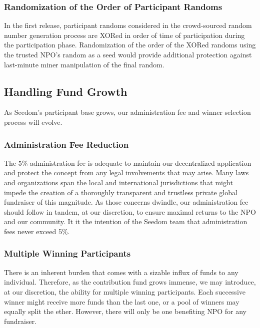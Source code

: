 \documentclass[11pt]{article}
\begin{document}
\subsubsection{Randomization of the Order of Participant Randoms}
\label{sec:randomizationOfTheOrderOfParticipantRandoms}

In the first release, participant randoms considered in the crowd-sourced random number generation process are XORed in order of time of participation during the participation phase. Randomization of the order of the XORed randoms using the trusted NPO's random as a seed would provide additional protection against last-minute miner manipulation of the final random.

\subsection{Handling Fund Growth}

As Seedom's participant base grows, our administration fee and winner selection process will evolve.

\subsubsection{Administration Fee Reduction}

The 5\% administration fee is adequate to maintain our decentralized application and protect the concept from any legal involvements that may arise. Many laws and organizations span the local and international jurisdictions that might impede the creation of a thoroughly transparent and trustless private global fundraiser of this magnitude. As those concerns dwindle, our administration fee should follow in tandem, at our discretion, to ensure maximal returns to the NPO and our community. It it the intention of the Seedom team that administration fees never exceed 5\%.

\subsubsection{Multiple Winning Participants}

There is an inherent burden that comes with a sizable influx of funds to any individual. Therefore, as the contribution fund grows immense, we may introduce, at our discretion, the ability for multiple winning participants. Each successive winner might receive more funds than the last one, or a pool of winners may equally split the ether. However, there will only be one benefiting NPO for any fundraiser.
\end{document}
